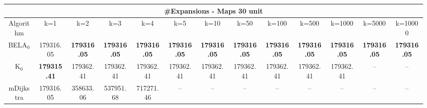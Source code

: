 \begin{tabular}{c|cccccccccccc}\toprule
\multicolumn{13}{c}{#Expansions - Maps 30 unit}\\ \midrule
Algorithm & k=1 & k=2 & k=3 & k=4 & k=5 & k=10 & k=50 & k=100 & k=500 & k=1000 & k=5000 & k=10000 \\ \midrule
BELA$_0$ & 179316.05 & \textbf{179316.05} & \textbf{179316.05} & \textbf{179316.05} & \textbf{179316.05} & \textbf{179316.05} & \textbf{179316.05} & \textbf{179316.05} & \textbf{179316.05} & \textbf{179316.05} & \textbf{179316.05} & \textbf{179316.05} \\
K$_0$ & \textbf{179315.41} & 179362.41 & 179362.41 & 179362.41 & 179362.41 & 179362.41 & 179362.41 & 179362.41 & 179362.41 & 179362.41 & -- & -- \\
mDijkstra & 179316.05 & 358633.06 & 537951.68 & 717271.46 & -- & -- & -- & -- & -- & -- & -- & -- \\ \bottomrule 
\end{tabular}
